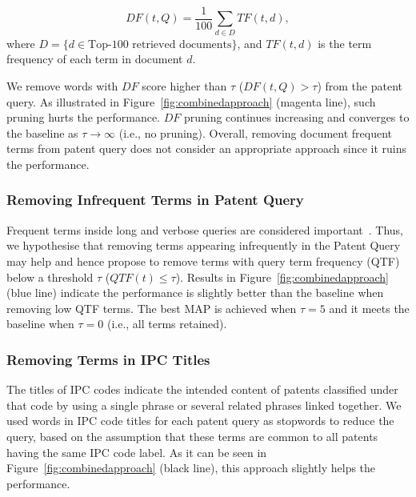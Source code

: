 \begin{equation}
 DF(t, Q)=\frac{1}{100}\sum_{d\in  D} TF(t, d),    
 \label{eq:df}
\end{equation}
where $D=\{d\in \mbox{Top-100 retrieved documents}\}$, and $TF(t, d)$ is the term frequency of each term in document $d$.

We remove words with $\mathit{DF}$ score higher than $\tau$ ($DF(t, Q)>\tau$) from the patent query. 
As illustrated in Figure~\ref{fig:combinedapproach} (magenta line), such pruning hurts the performance. $\mathit{DF}$ pruning continues increasing and converges to the baseline as $\tau \to \infty $ (i.e., no pruning).
Overall, removing document frequent terms from patent query does not consider an appropriate approach since it ruins the performance. 
\subsubsection{Removing Infrequent Terms in Patent Query}
Frequent terms inside long and verbose queries are considered important~\citep{maxwell2013compact}. Thus, we hypothesise that removing terms appearing infrequently in the Patent Query may help and hence propose to remove terms with query term frequency (QTF) below a threshold $\tau$ ($QTF(t) \leq \tau$). Results in Figure~\ref{fig:combinedapproach} (blue line) indicate the performance is slightly better than the baseline when removing low QTF terms.  The best MAP is achieved when $\tau=5$ and it meets the baseline when $\tau=0$ (i.e., all terms retained). 
\subsubsection{Removing Terms in IPC Titles}
The titles of IPC codes indicate the intended content of patents classified under that code by using a single phrase or several related phrases linked together. We used words in IPC code titles for each patent query as stopwords to reduce the query, based on the assumption that these terms are common to all patents having the same IPC code label.  As it can be seen in Figure~\ref{fig:combinedapproach} (black line), this approach slightly helps the performance.
